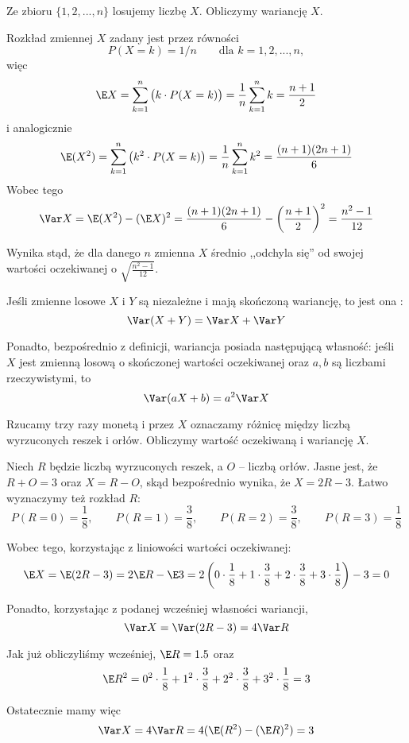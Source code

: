 \begin{example}
    Ze zbioru $\{1, 2, ..., n\}$ losujemy liczbę $X$. Obliczymy wariancję $X$.

    Rozkład zmiennej $X$ zadany jest przez równości
    $$P(X = k) = 1/n \qquad \text{dla } k = 1, 2, ..., n,$$
    więc
    $$\E X = \sum_{k = 1}^{n} \big(k \cdot P(X = k)\big) = \frac{1}{n} \sum_{k = 1}^{n} k = \frac{n + 1}{2}$$
    i analogicznie
    $$\E (X^2) = \sum_{k = 1}^{n} \big(k^2 \cdot P(X = k)\big) = \frac{1}{n} \sum_{k = 1}^{n} k^2 = \frac{(n + 1)(2n + 1)}{6}$$
    Wobec tego
    $$\Var X = \E (X^2) - (\E X)^2 = \frac{(n + 1)(2n + 1)}{6} - \left(\frac{n + 1}{2}\right)^2 = \frac{n^2 - 1}{12}$$

    Wynika stąd, że dla danego $n$ zmienna $X$ średnio ,,odchyla się'' od swojej wartości oczekiwanej o $\sqrt{\frac{n^2 - 1}{12}}$.
\end{example}

Jeśli zmienne losowe $X$ i $Y$ są niezależne i mają skończoną wariancję, to jest ona :
$$
\Var (X+Y) = \Var X + \Var Y
$$

Ponadto, bezpośrednio z definicji, wariancja posiada następującą własność: jeśli $X$ jest zmienną losową o skończonej wartości oczekiwanej oraz $a, b$ są liczbami rzeczywistymi, to
$$\Var (aX + b) = a^2 \Var X$$

\begin{example}
    Rzucamy trzy razy monetą i przez $X$ oznaczamy różnicę między liczbą wyrzuconych reszek i orłów. Obliczymy wartość oczekiwaną i wariancję $X$.

    Niech $R$ będzie liczbą wyrzuconych reszek, a $O$ -- liczbą orłów. Jasne jest, że $R + O = 3$ oraz $X = R - O$, skąd bezpośrednio wynika, że $X = 2R - 3$. Łatwo wyznaczymy też rozkład $R$:
    $$P(R = 0) = \frac{1}{8}, \qquad P(R = 1) = \frac{3}{8}, \qquad P(R = 2) = \frac{3}{8}, \qquad P(R = 3) = \frac{1}{8}$$

    Wobec tego, korzystając z liniowości wartości oczekiwanej:
    $$\E X = \E (2R - 3) = 2 \E R - \E 3 = 2 \left(0 \cdot \frac{1}{8} + 1 \cdot \frac{3}{8} + 2 \cdot \frac{3}{8} + 3 \cdot \frac{1}{8}\right) - 3 = 0$$

    Ponadto, korzystając z podanej wcześniej własności wariancji,
    $$\Var X = \Var (2R - 3) = 4 \Var R$$

    Jak już obliczyliśmy wcześniej, $\E R = 1.5$ oraz
    $$\E R^2 = 0^2 \cdot \frac{1}{8} + 1^2 \cdot \frac{3}{8} + 2^2 \cdot \frac{3}{8} + 3^2 \cdot \frac{1}{8} = 3$$

    Ostatecznie mamy więc
    $$\Var X = 4 \Var R = 4 (\E (R^2) - (\E R)^2) = 3$$
\end{example}


